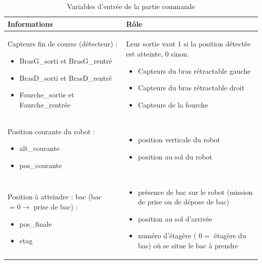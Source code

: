 \begin{table}[h]
\centering
\begin{tabular}{p{.45\linewidth}p{.45\linewidth}}
\hline
\textbf{Informations} & \textbf{Rôle} \\
\hline
Capteurs fin de course (détecteur) :
\begin{itemize} 
\item BrasG\_sorti et BrasG\_rentré 
\item BrasD\_sorti et BrasD\_rentré 
\item Fourche\_sortie et Fourche\_rentrée 
\end{itemize} & 
Leur sortie vaut 1 si la position détectée est atteinte, 0 sinon.
\begin{itemize} 
\item Capteurs du bras rétractable gauche 
\item Capteurs du bras rétractable droit 
\item Capteurs de la fourche 
\end{itemize} \\
\hline
Position courante du robot : 
\begin{itemize}
\item alt\_courante 
\item pos\_courante 
\end{itemize} & 
\begin{itemize}
\item position verticale du robot
\item position au sol du robot
\end{itemize} \\
\hline
Position à atteindre : bac (bac $=0 \rightarrow$ prise de bac) :
\begin{itemize}
\item pos\_finale
\item etag 
\end{itemize}
& 
\begin{itemize}
\item présence de bac sur le robot (mission de prise ou de dépose de bac) 
\item position au sol d'arrivée 
\item numéro d'étagère ( $0=$ étagère du bas) où se situe le bac à prendre 
\end{itemize} \\ 
\hline
\end{tabular}
\caption{Variables d'entrée de la partie commande \label{cy_08_02_stm_td_04_tab_02}}

\end{table}

